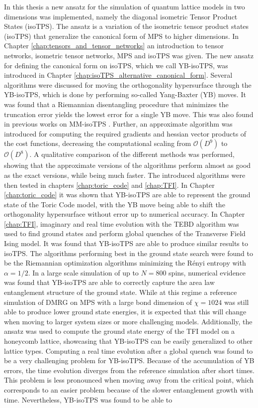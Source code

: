 In this thesis a new ansatz for the simulation of quantum lattice models in two dimensions was implemented, namely the diagonal isometric Tensor Product States (isoTPS). The ansatz is a variation of the isometric tensor product states (isoTPS) that generalize the canonical form of MPS to higher dimensions. In Chapter \ref{chap:tensors_and_tensor_networks} an introduction to tensor networks, isometric tensor networks, MPS and isoTPS was given. The new ansatz for defining the canonical form on isoTPS, which we call YB-isoTPS, was introduced in Chapter \ref{chap:isoTPS_alternative_canonical_form}. Several algorithms were discussed for moving the orthogonality hypersurface through the YB-isoTPS, which is done by performing so-called Yang-Baxter (YB) moves. It was found that a Riemannian disentangling procedure that minimizes the truncation error yields the lowest error for a single YB move. This was also found in previous works on MM-isoTPS \cite{cite:isometric_tensor_network_states_in_two_dimensions, cite:efficient_simulation_of_dynamics_in_two_dimensional_quantum_spin_systems}. Further, an approximate algorithm was introduced for computing the required gradients and hessian vector products of the cost functions, decreasing the computational scaling from $\mathcal{O}(D^9)$ to $\mathcal{O}(D^8)$. A qualitative comparison of the different methods was performed, showing that the approximate versions of the algorithms perform almost as good as the exact versions, while being much faster. The introduced algorithms were then tested in chapters \ref{chap:toric_code} and \ref{chap:TFI}. In Chapter \ref{chap:toric_code} it was shown that YB-isoTPS are able to represent the ground state of the Toric Code model, with the YB move being able to shift the orthogonality hypersurface without error up to numerical accuracy. In Chapter \ref{chap:TFI}, imaginary and real time evolution with the TEBD algorithm was used to find ground states and perform global quenches of the Transverse Field Ising model. It was found that YB-isoTPS are able to produce similar results to isoTPS. The algorithms performing best in the ground state search were found to be the Riemannian optimization algorithms minimizing the Rényi entropy with $\alpha = 1/2$. In a large scale simulation of up to $N = 800$ spins, numerical evidence was found that YB-isoTPS are able to correctly capture the area law entanglement structure of the ground state. While at this regime a reference simulation of DMRG on MPS with a large bond dimension of $\chi = 1024$ was still able to produce lower ground state energies, it is expected that this will change when moving to larger system sizes or more challenging models. Additionally, the ansatz was used to compute the ground state energy of the TFI model on a honeycomb lattice, showcasing that YB-isoTPS can be easily generalized to other lattice types. Computing a real time evolution after a global quench was found to be a very challenging problem for YB-isoTPS. Because of the accumulation of YB errors, the time evolution diverges from the reference simulation after short times. This problem is less pronounced when moving away from the critical point, which corresponds to an easier problem because of the slower entanglement growth with time. Nevertheless, YB-isoTPS was found to be able to 